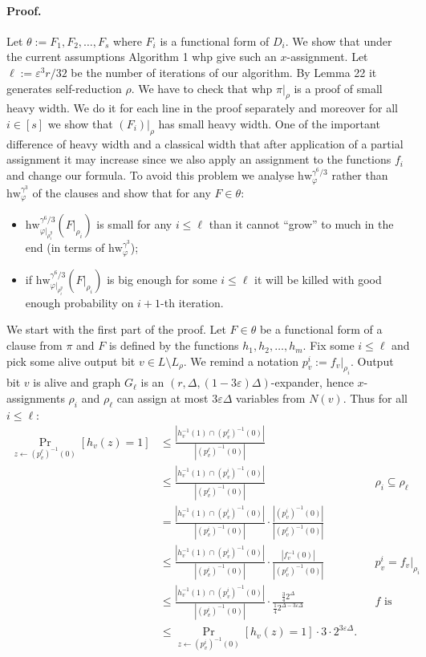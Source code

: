 \documentclass[10pt,a4paper]{article}
\begin{document}
\paragraph{Proof.} Let $\theta:=F_1,F_2,\ldots,F_s$ where $F_i$ is a functional form of $D_i$.
We show that under the current assumptions Algorithm 1 whp give such an $x$-assignment. Let $\ell:=\varepsilon^3r/32$ be the number of iterations of our algorithm. By Lemma 22 it generates self-reduction $\rho$. We have to check that whp $\pi|_\rho$ is a proof of small heavy width. We do it for each line in the proof separately and moreover for all $i\in[s]$ we show that $(F_i)|_\rho$ has small heavy width.
One of the important difference of heavy width and a classical width that after application of a partial assignment it may increase since we also apply an assignment to the functions $f_i$ and change our formula. To avoid this problem we analyse $\mathrm{hw}_{\varphi}^{\gamma^6/3}$ rather than $\mathrm{hw}_{\varphi}^{\gamma^3}$ of the clauses and show that for any $F\in\theta$:
\begin{itemize}
\item $\mathrm{hw}_{\varphi|_{\rho_i^y}}^{\gamma^6/3}(F|_{\rho_i})$ is small for any $i\leq\ell$ than it cannot ``grow'' to much in the end (in terms of $\mathrm{hw}_{\varphi}^{\gamma^3}$);
\item if $\mathrm{hw}_{\varphi|_{\rho_i^y}}^{\gamma^6/3}(F|_{\rho_i})$ is big enough for some $i\leq\ell$ it will be killed with good enough probability on $i+1$-th iteration.
\end{itemize}
We start with the first part of the proof. Let $F\in\theta$ be a functional form of a clause from $\pi$ and $F$ is defined by the functions $h_1,h_2,\ldots,h_m$. Fix some $i\leq\ell$ and pick some alive output bit $v\in L\setminus L_\rho$. We remind a notation $p_v^i:=f_v|_{\rho_i}$. Output bit $v$ is alive and graph $G_\ell$ is an $(r,\Delta,(1-3\varepsilon)\Delta)$-expander, hence $x$-assignments $\rho_i$ and $\rho_\ell$ can assign at most $3\varepsilon\Delta$ variables from $N(v)$. Thus for all $i\leq\ell$:
\begin{align*}
\Pr_{z\leftarrow(p_v^\ell)^{-1}(0)}[h_v(z)=1]
&\leq\frac{|h_v^{-1}(1)\cap(p_v^\ell)^{-1}(0)|}{|(p_v^\ell)^{-1}(0)|}\\
&\leq\frac{|h_v^{-1}(1)\cap(p_v^i)^{-1}(0)|}{|(p_v^\ell)^{-1}(0)|}&&\rho_i\subseteq\rho_\ell\\
&=\frac{|h_v^{-1}(1)\cap(p_v^i)^{-1}(0)|}{|(p_v^i)^{-1}(0)|}\cdot\frac{|(p_v^i)^{-1}(0)|}{|(p_v^\ell)^{-1}(0)|}\\
&\leq\frac{|h_v^{-1}(1)\cap(p_v^i)^{-1}(0)|}{|(p_v^i)^{-1}(0)|}\cdot\frac{|f_v^{-1}(0)|}{|(p_v^\ell)^{-1}(0)|}&&p_v^i=f_v|_{\rho_i}\\
&\leq\frac{|h_v^{-1}(1)\cap(p_v^i)^{-1}(0)|}{|(p_v^i)^{-1}(0)|}\cdot\frac{\frac342^\Delta}{\frac142^{\Delta-3\varepsilon\Delta}}&&f\text{ is balanced}\\
&\leq\Pr_{z\leftarrow(p_v^i)^{-1}(0)}[h_v(z)=1]\cdot3\cdot2^{3\varepsilon\Delta}.
\end{align*}
\end{document}
